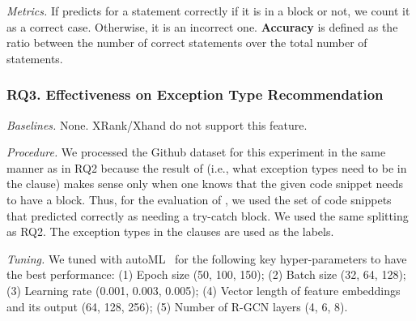 
{\em Metrics.} If {\xstate} predicts for a statement correctly if it
is in a  block or not, we count it as a correct case.
Otherwise, it is an incorrect one. \textbf{Accuracy} is
defined as the ratio between the number of correct statements over the
total number of statements.


\subsubsection{RQ3. Effectiveness on Exception Type Recommendation\\}

{\em Baselines.} None. XRank/Xhand do not support this feature.


{\em Procedure.} We processed the Github dataset for this experiment
in the same manner as in RQ2 because the result of {\xtype} (i.e.,
what exception types need to be in the  clause) makes
sense only when one knows that the given code snippet needs to have a
 block. Thus, for the evaluation of {\xtype}, we used
the set of code snippets that {\xblock} predicted correctly as needing
a try-catch block. We used the same splitting as RQ2. The exception
types in the  clauses are used as the labels.


{\em Tuning.} We tuned {\tool} with autoML~\cite{NNI} for the
following key hyper-parameters to have the best performance: (1) Epoch
size (50, 100, 150); (2) Batch size (32, 64, 128); (3) Learning rate
(0.001, 0.003, 0.005); (4) Vector length of feature embeddings and its
output (64, 128, 256); (5) Number of R-GCN layers (4, 6, 8).

